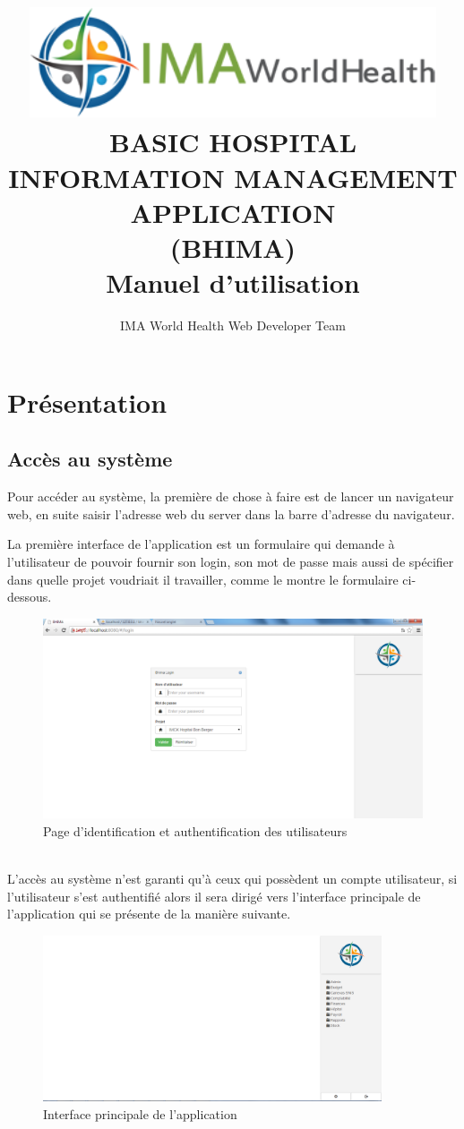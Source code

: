 \documentclass[12pt,a4paper]{report}
\author{IMA World Health Web Developer Team}
\title{\includegraphics[width=12cm]{ima.png} \\BASIC HOSPITAL INFORMATION MANAGEMENT APPLICATION\\ (BHIMA) \\ Manuel d'utilisation}
\begin{document}
\maketitle 
\chapter{Présentation}
\section{Accès au système}
\large{Pour accéder au système, la première de chose à faire est de lancer un navigateur web, en suite saisir l'adresse web du server dans la barre d'adresse du navigateur.}

La première interface de l'application est un formulaire qui demande à l'utilisateur de pouvoir fournir son login, son mot de passe mais aussi de spécifier dans quelle projet voudriait il travailler, comme le montre le formulaire ci-dessous.
\begin{figure}[h]
\begin{center}
\includegraphics[width=12cm]{pic/login.png}
\end{center}
\caption{Page d'identification et authentification des utilisateurs}
\label{Page d'identification et authentification des utilisateurs}
\end{figure}
\\ L'accès au système n'est garanti qu'à ceux qui possèdent un compte utilisateur, si l'utilisateur s'est authentifié alors il sera dirigé vers l'interface principale de l'application qui se présente de la manière suivante.
\newpage
\begin{figure}[h]
\begin{center} 
\includegraphics[width=10cm]{pic/mainInterface.png}
\end{center}
\caption{Interface principale de l'application}
\label{Interface principale de l'application}
\end{figure} 
\end{document}
